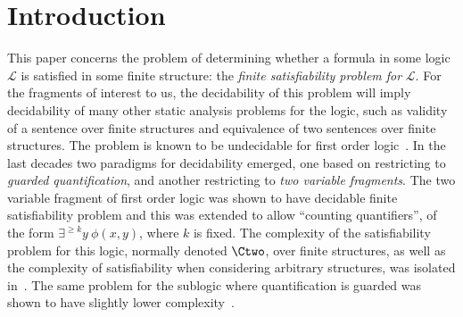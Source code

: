 



\begin{abstract}
We present new results on finite satisfiability of logics with counting and arithmetic.
One result is a tight bound on the complexity of satisfiability of logics with so-called local Presburger quantifiers, which sum over neighbors of a node in a graph. A second contribution concerns computing a semilinear representation of the cardinalities associated with a formula in two variable logic extended with counting quantifiers. Such a representation allows you to get bounds not only on satisfiability for these logics, but for satisfiability in the presence of additional ``global cardinality constraints'': restrictions on cardinalities of unary formulas, expressed using arbitrary decidability logics over arithmetic.
In the process, we provide simpler proofs of some key prior  results on finite satisfiability and semi-linearity of the spectrum for these  logics.
\end{abstract}

\section{Introduction}\label{sec:intro}
This paper concerns the  problem of determining whether a formula in some logic $\mathcal{L}$ is satisfied in some finite structure: the \emph{finite satisfiability problem for} $\mathcal{L}$. For the fragments of interest to us, the decidability of this problem will imply decidability of many other static analysis problems for the logic, such as validity of a sentence over finite structures and equivalence of two sentences over finite structures.
The problem is known
to be undecidable for first order logic~\cite{traktenbrot}. 
In the last decades two paradigms for decidability emerged, one based on restricting to \emph{guarded quantification}, and another restricting to \emph{two variable fragments}.
The two variable fragment of first order logic was shown to have decidable finite satisfiability problem and this was extended to allow ``counting quantifiers'',  of the form $\exists^{\ge k} y ~ \phi(x,y)$, where $k$ is fixed. The complexity of the satisfiability problem for this logic, normally denoted $\Ctwo$, over finite structures, as well as the complexity of satisfiability when considering arbitrary structures, was isolated in~\cite{ctwocomplexity}. The same problem for the sublogic where quantification is guarded was shown 
to have slightly lower complexity~\cite{gctwocomplexity}.

